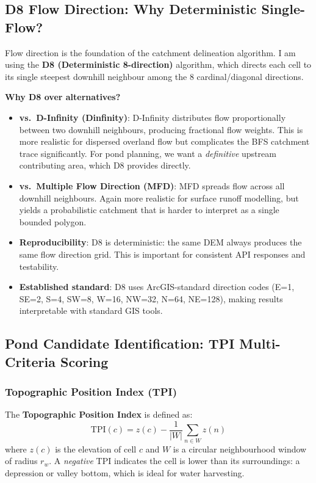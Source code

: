 \documentclass[12pt,a4paper]{article}
\begin{document}
\subsection{D8 Flow Direction: Why Deterministic Single-Flow?}

Flow direction is the foundation of the catchment delineation algorithm. I am using the \textbf{D8 (Deterministic 8-direction)} algorithm, which directs each cell to its single steepest downhill neighbour among the 8 cardinal/diagonal directions.

\textbf{Why D8 over alternatives?}

\begin{itemize}
\item \textbf{vs.\ D-Infinity (Dinfinity)}: D-Infinity distributes flow proportionally between two downhill neighbours, producing fractional flow weights. This is more realistic for dispersed overland flow but complicates the BFS catchment trace significantly. For pond planning, we want a \emph{definitive} upstream contributing area, which D8 provides directly.
\item \textbf{vs.\ Multiple Flow Direction (MFD)}: MFD spreads flow across all downhill neighbours. Again more realistic for surface runoff modelling, but yields a probabilistic catchment that is harder to interpret as a single bounded polygon.
\item \textbf{Reproducibility}: D8 is deterministic: the same DEM always produces the same flow direction grid. This is important for consistent API responses and testability.
\item \textbf{Established standard}: D8 uses ArcGIS-standard direction codes (E=1, SE=2, S=4, SW=8, W=16, NW=32, N=64, NE=128), making results interpretable with standard GIS tools.
\end{itemize}

\subsection{Pond Candidate Identification: TPI Multi-Criteria Scoring}

\subsubsection{Topographic Position Index (TPI)}

The \textbf{Topographic Position Index} is defined as:
\begin{equation}
    \text{TPI}(c) = z(c) - \frac{1}{|W|}\sum_{n \in W} z(n)
\end{equation}
where $z(c)$ is the elevation of cell $c$ and $W$ is a circular neighbourhood window of radius $r_w$. A \emph{negative} TPI indicates the cell is lower than its surroundings: a depression or valley bottom, which is ideal for water harvesting.
\end{document}
